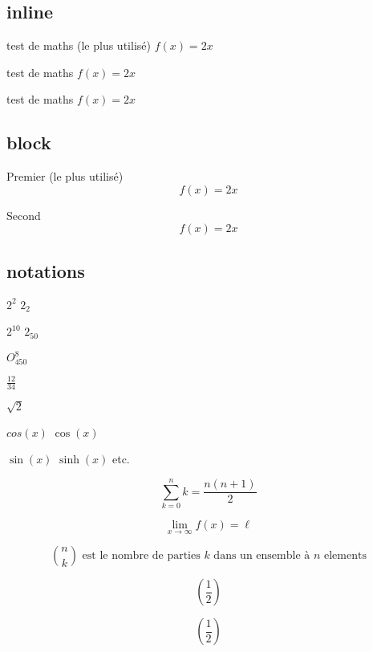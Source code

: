 \documentclass[a4paper, 12pt, french]{article}
\begin{document}
	\subsection{inline}

		test de maths (le plus utilisé) $f(x) = 2x$

		test de maths  \(f(x) = 2x\)

		test de maths  \begin{math} f(x) = 2x \end{math}

	\subsection{block}

		Premier (le plus utilisé)
		\[
			f(x) = 2x
		\]

		Second
		\begin{displaymath}
			f(x) = 2x
		\end{displaymath}

	\subsection{notations}
		$2^2$
		$2_2$

		$2^{10}$
		$2_{50}$

		$O^8_{450}$

		$\frac{12}{34}$

		$\sqrt{2}$

		$cos(x)$ %
		$\cos(x)$ %

		$\sin(x)$
		$\sinh(x)$
		etc.

		\[
			\sum_{k = 0}^{n} k = \frac{n(n+1)}{2}
		\]

		\[
			\lim_{x \to \infty} f(x) = \ell
		\]

		\[
			\binom{n}{k} \text{ est le nombre de parties $k$ dans un ensemble à $n$ elements}
		\]

		\[ %
			( \frac{1}{2} )
		\]

		\[ %
			\left( \frac{1}{2} \right)
		\]
\end{document}
